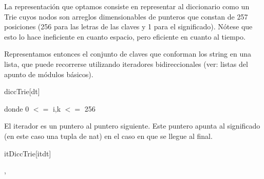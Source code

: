 \begin{Representacion}


La representación que optamos consiste en representar al diccionario como un Trie cuyos nodos son arreglos dimensionables de punteros que constan de 257 posiciones (256 para las letras de las claves y 1 para el significado). Nótese que esto lo hace ineficiente en cuanto espacio, pero eficiente en cuanto al tiempo.\par 
Representamos entonces el conjunto de claves que conforman los string en una lista, que puede recorrerse utilizando iteradores bidireccionales (ver: listas del apunto de módulos básicos).

  \begin{Estructura}{diccTrie}[dt]
    \begin{Tupla}[dt]%
   		 donde 0 $<=$ i,k $<=$ 256
    \end{Tupla}
  \end{Estructura}






  
  El iterador es un puntero al puntero siguiente. Este puntero apunta al significado (en este caso una tupla de nat) en el caso en que se llegue al final.
   
  \begin{Estructura}{itDiccTrie}[itdt]
    \begin{Tupla}[itdt]%
		,
    \end{Tupla}
  \end{Estructura}

\end{Representacion}

\clearpage


